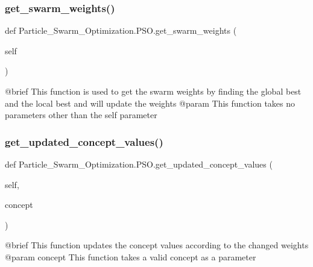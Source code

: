 \subsubsection{\texorpdfstring{get\+\_\+swarm\+\_\+weights()}{get\_swarm\_weights()}}
{\footnotesize\ttfamily def Particle\+\_\+\+Swarm\+\_\+\+Optimization.\+P\+S\+O.\+get\+\_\+swarm\+\_\+weights (\begin{DoxyParamCaption}\item[{}]{self }\end{DoxyParamCaption})}

\begin{DoxyVerb}@brief   This function is used to get the swarm weights by finding the
     global best and the local best and will update the weights
@param  This function takes no parameters other than the self parameter\end{DoxyVerb}
 \hypertarget{class_particle___swarm___optimization_1_1_p_s_o_abf63d69aa42e75058a939c6dac4416c5}{}\label{class_particle___swarm___optimization_1_1_p_s_o_abf63d69aa42e75058a939c6dac4416c5} 
\subsubsection{\texorpdfstring{get\+\_\+updated\+\_\+concept\+\_\+values()}{get\_updated\_concept\_values()}}
{\footnotesize\ttfamily def Particle\+\_\+\+Swarm\+\_\+\+Optimization.\+P\+S\+O.\+get\+\_\+updated\+\_\+concept\+\_\+values (\begin{DoxyParamCaption}\item[{}]{self,  }\item[{}]{concept }\end{DoxyParamCaption})}

\begin{DoxyVerb}@brief This function updates the concept values according to the changed weights
@param concept This function takes a valid concept as a parameter
\end{DoxyVerb}
 \hypertarget{class_particle___swarm___optimization_1_1_p_s_o_a923072a9af1fea8affadfd0bd1a947cf}{}\label{class_particle___swarm___optimization_1_1_p_s_o_a923072a9af1fea8affadfd0bd1a947cf} 

